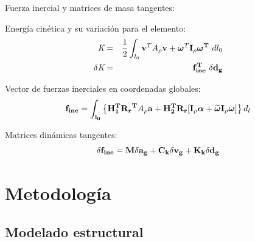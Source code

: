 \documentclass[
  aspectratio=169,
]{beamer}
\begin{document}
\begin{small}
\begin{frame}{Fuerza inercial y matrices de masa tangentes:}
		\begin{minipage}[t]{0.45\linewidth}\vfill
			\begin{block}{Energía cinética y su variación para el elemento:}
				\begin{eqnarray}
					\textit{K}&=&\frac{1}{2}\int_{l_0} {\bf{v}}^T A_{\rho} {\bf{v}} + \boldsymbol{\omega}^T \bf{I_{\rho}} \boldsymbol{\omega}^T ~\text{$dl_0$}\\
					\delta\textit{K}&=&\bf{f_{ine}^T}~\delta\bf{d}_g
				\end{eqnarray}
			\end{block}
		\end{minipage}\hfill
		\begin{minipage}[t]{0.48\linewidth}
			\begin{block}{Vector de fuerzas inerciales en coordenadas globales:}
				\begin{equation}
				\bf{f}_{ine}= \int _{l_0} \left \{ \bf{H}_1^T\bf{R_r}^T \text{$A_\rho$}\bf{a} +\bf{H}_2^T \bf{R_r} [\bf{I}_\rho\boldsymbol{\alpha}+\widetilde{\boldsymbol{\omega}}\bf{I}_\rho\boldsymbol{\omega}] \right \} \text{$d_l$}
				\end{equation}
			\end{block}
			\begin{block}{Matrices dinámicas tangentes:}
				\begin{equation}
					\delta \bf{f_{ine}}= \bf{M} \delta {\bf{a}_g}+\bf{C}_k \delta {\bf{v}_g}+\bf{K}_k \delta \bf{d}_g
				\end{equation}
			\end{block}
		\end{minipage}
	\end{frame}
\section[Metodología]{Metodología}

\subsection[Modelado estructural]{Modelado estructural}


\end{small}
\end{document}
